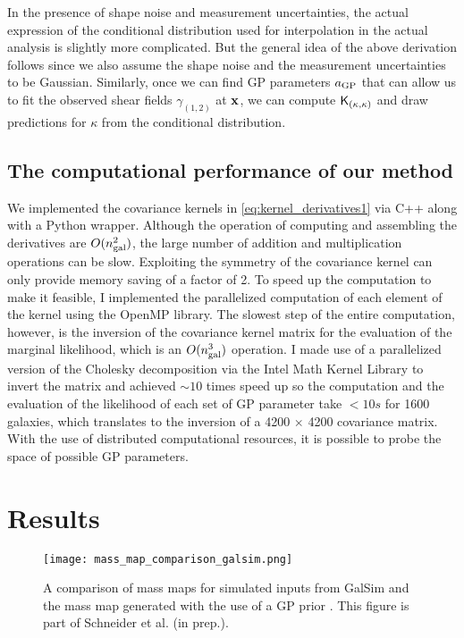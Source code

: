 In the presence of shape noise and measurement uncertainties, the actual 
expression of the conditional distribution used for interpolation in the actual analysis 
is slightly more complicated. But the general idea of the above derivation follows 
since we also assume the shape noise and the measurement uncertainties to be Gaussian.
Similarly, once we can find GP parameters $a_{\rm GP}$ that can allow us to fit
the observed shear fields $\gamma_{(1, 2)}$ at $\mathbf{x}$, we can compute $\mathsf{K}_{(\kappa,
\kappa)}$ and draw predictions for $\kappa$ from the conditional distribution. 

\subsection{The computational performance of our method}
We implemented the covariance kernels in \ref{eq:kernel_derivatives1}
via {\sc C++} along with a {\sc Python} wrapper. 
Although the operation of computing and assembling the
derivatives are $O(n_{\rm gal}^2)$, the large number of addition and 
multiplication operations can be slow.
Exploiting the symmetry of the covariance kernel can only provide 
memory saving of a factor of 2.
To speed up the computation to make it feasible, 
I implemented the parallelized computation of each element of the kernel using 
the {\sc OpenMP} library. The slowest step of the entire computation, however, 
is the inversion of the
covariance kernel matrix for the evaluation of the marginal likelihood, 
which is an $O(n_{\rm gal}^3)$ operation. 
I made use of a parallelized version of the Cholesky decomposition via the {\sc Intel Math
Kernel Library} to invert the matrix and achieved $\sim10$ 
times speed up so the
computation and the evaluation of the likelihood of each set of GP parameter
take $< 10s$ for 1600 galaxies, which translates to 
the inversion of a 4200 $\times$ 4200 covariance matrix.
With the use of distributed computational resources, it is possible 
to probe the space of possible GP parameters.  

\section{Results}
 \begin{figure}
	\centering
	\texttt{[image: mass\_map\_comparison\_galsim.png]}
	\caption{A comparison of mass maps for simulated inputs from {\sc GalSim} and
	the mass map generated with the use of a GP prior \label{fig:Galsim_massmaps}. 
	This figure is part of Schneider et al. (in prep.).
}
\end{figure}


